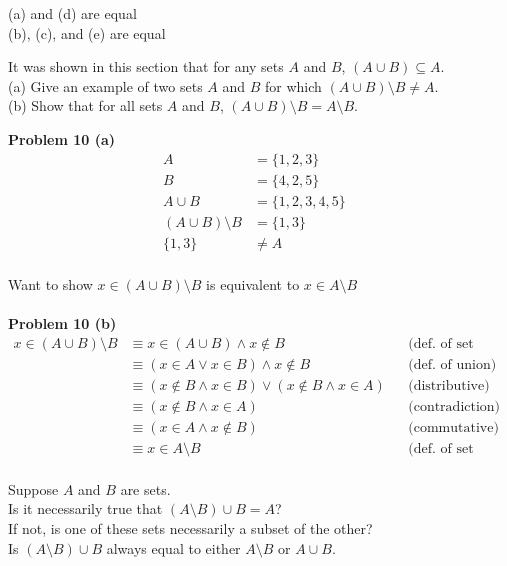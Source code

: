 (a) and (d) are equal \\
(b), (c), and (e) are equal

\begin{tcolorbox}[title=Problem 10, breakable]
It was shown in this section that for any sets $A$ and $B$, $(A \cup B) \subseteq A$. \\
(a) Give an example of two sets $A$ and $B$ for which $(A \cup B) \setminus B \not = A$. \\
(b) Show that for all sets $A$ and $B$, $(A \cup B) \setminus B = A \setminus B$.
\end{tcolorbox}

\textbf{Problem 10 (a)}
\begin{align*}
A &= \{1, 2, 3\} & \\
B &= \{4, 2, 5\} & \\
A \cup B &= \{1, 2, 3, 4, 5\} & \\
(A \cup B) \setminus B &= \{1, 3\} & \\
\{1, 3\} &\not = A & \\
\end{align*}

Want to show $x \in (A \cup B) \setminus B$ is equivalent to $x \in A \setminus B$ \\ \\
\textbf{Problem 10 (b)}
\begin{align*}
x \in (A \cup B) \setminus B 
&\equiv x \in (A \cup B) \wedge x \notin B &&\text{(def. of set difference)} \\
&\equiv (x \in A \vee x \in B) \wedge x \notin B &&\text{(def. of union)} \\
&\equiv (x \notin B \wedge x \in B) \vee (x \notin B \wedge x \in A) &&\text{(distributive)} \\
&\equiv (x \notin B \wedge x \in A) &&\text{(contradiction)} \\
&\equiv (x \in A \wedge x \notin B) &&\text{(commutative)} \\
&\equiv x \in A \setminus B &&\text{(def. of set difference)} \\
\end{align*}

\begin{tcolorbox}[title=Problem 11, breakable]
Suppose $A$ and $B$ are sets. \\
Is it necessarily true that $(A \setminus B) \cup B = A$? \\
If not, is one of these sets necessarily a subset of the other? \\
Is $(A \setminus B) \cup B$ always equal to either $A \setminus B$ or $A \cup B$.
\end{tcolorbox}

